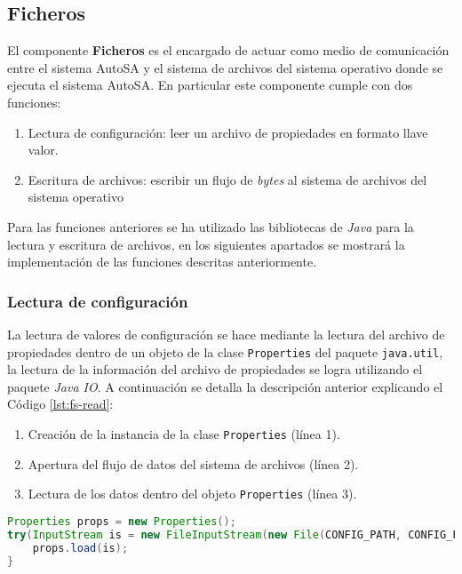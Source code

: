 \subsection{Ficheros}
El componente \textbf{Ficheros} es el encargado de actuar como medio de comunicación entre el sistema AutoSA y el sistema de archivos del sistema operativo donde se ejecuta el sistema AutoSA. En particular este componente cumple con dos funciones:
\begin{enumerate}
	\item Lectura de configuración: leer un archivo de propiedades en formato llave valor.
	\item Escritura de archivos: escribir un flujo de \textit{bytes} al sistema de archivos del sistema operativo
\end{enumerate}
Para las funciones anteriores se ha utilizado las bibliotecas de \textit{Java} para la lectura y escritura de archivos, en los siguientes apartados se mostrará la implementación de las funciones descritas anteriormente.

\subsubsection{Lectura de configuración}
La lectura de valores de configuración se hace mediante la lectura del archivo de propiedades dentro de un objeto de la clase \texttt{Properties} del paquete \texttt{java.util}, la lectura de la información del archivo de propiedades se logra utilizando el paquete \textit{Java IO}. A continuación se detalla la descripción anterior explicando el Código \ref{lst:fs-read}:

\begin{enumerate}
 	\item Creación de la instancia de la clase \texttt{Properties} (línea 1).
 	\item Apertura del flujo de datos del sistema de archivos (línea 2).
 	\item Lectura de los datos dentro del objeto \texttt{Properties} (línea 3).
 \end{enumerate}

\begin{lstlisting}[language=Java, caption={Lectura de un archivo de propiedades.}, captionpos=b, label={lst:fs-read}]
Properties props = new Properties();
try(InputStream is = new FileInputStream(new File(CONFIG_PATH, CONFIG_FILENAME));){
	props.load(is);
}
\end{lstlisting}

